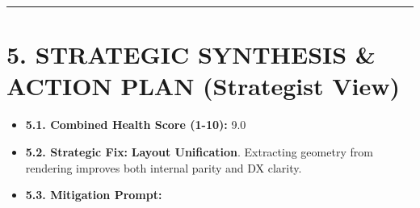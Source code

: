 \begin{center}\rule{0.5\linewidth}{0.5pt}\end{center}

\section{5. STRATEGIC SYNTHESIS \& ACTION PLAN (Strategist View)}\label{record-413-strategic-synthesis-action-plan-strategist-view}

\begin{itemize}
\tightlist
\item
  \textbf{5.1. Combined Health Score (1-10):} 9.0
\item
  \textbf{5.2. Strategic Fix:} \textbf{Layout Unification}. Extracting geometry from rendering improves both internal parity and DX clarity.
\item
  \textbf{5.3. Mitigation Prompt:}


\end{itemize}
